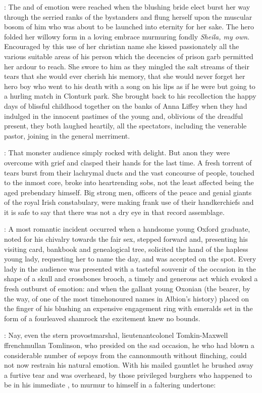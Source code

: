 :
The  and 
of emotion were reached when the blushing bride elect burst
her way through the serried ranks of the bystanders and flung herself upon
the muscular bosom of him who was about to be launched into eternity for
her sake. The hero folded her willowy form in a loving embrace murmuring
fondly \emph{Sheila, my own}. Encouraged by this use of her christian name she
kissed passionately all the various suitable areas of his person which the
decencies of prison garb permitted her ardour to reach. She swore to him
as they mingled the salt streams of their tears that she would ever
cherish his memory, that she would never forget her hero boy who went to
his death with a song on his lips as if he were but going to a hurling
match in Clonturk park. She brought back to his recollection the happy
days of blissful childhood together on the banks of Anna Liffey when they
had indulged in the innocent pastimes of the young and, oblivious of the
dreadful present, they both laughed heartily, all the spectators,
including the venerable pastor, joining in the general merriment.

:
That monster audience simply rocked with delight. But anon they were overcome
with grief and clasped their hands for the last time. A fresh torrent of
tears burst from their lachrymal ducts and the vast concourse of people,
touched to the inmost core, broke into heartrending sobs, not the least
affected being the aged prebendary himself. Big strong men, officers of
the peace and genial giants of the royal Irish constabulary,
were making frank use of their handkerchiefs and it is safe to say
that there was not a dry eye in that record assemblage.

:
A most romantic incident occurred when a handsome young Oxford graduate,
noted for his chivalry towards the fair sex, stepped forward and,
presenting his visiting card, bankbook and genealogical tree,
solicited the hand of the hapless young lady, requesting her to
name the day, and was accepted on the spot. Every lady in the
audience was presented with a tasteful souvenir of the occasion
in the shape of a skull and crossbones brooch, a timely and generous
act which evoked a fresh outburst of emotion: and when the gallant
young Oxonian (the bearer, by the way, of one of the most timehonoured
names in Albion's history) placed on the finger of his blushing
an expensive engagement ring with emeralds set in the form of a
fourleaved shamrock the excitement knew no bounds.

:
Nay, even the stern
provostmarshal, lieutenantcolonel Tomkin-Maxwell ffrenchmullan Tomlinson,
who presided on the sad occasion, he who had blown a considerable number
of sepoys from the cannonmouth without flinching, could not now restrain
his natural emotion. With his mailed gauntlet he brushed away a furtive
tear and was overheard, by those privileged burghers who happened to be
in his immediate ,
to murmur to himself in a faltering undertone:

